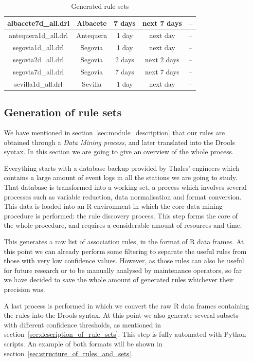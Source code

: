 \begin{table}
\begin{center}
\begin{tabular}{|c|c|c|c|c|}
\hline  
albacete7d\_all.drl & Albacete & 7 days & next 7 days & -- \\ 
\hline 
antequera1d\_all.drl & Antequera & 1 day & next day & -- \\ 
\hline 
segovia1d\_all.drl & Segovia & 1 day & next day & -- \\ 
\hline
segovia2d\_all.drl & Segovia & 2 days & next 2 days & -- \\  
\hline 
segovia7d\_all.drl & Segovia & 7 days & next 7 days & -- \\  
\hline 
sevilla1d\_all.drl & Sevilla & 1 day & next day & -- \\ 
\hline

\end{tabular} 
\caption{Generated rule sets} \label{tab:ruleset_list}
\end{center}
\end{table}

\subsection{Generation of rule sets}
\label{sec:generation_of_rule_sets}

We have mentioned in section~\ref{sec:module_description} that our rules are obtained through a \emph{Data Mining process}, and later translated into the Drools syntax. In this section we are going to give an overview of the whole process.

Everything starts with a database backup provided by Thales' engineers which contains a large amount of event logs in all the stations we are going to study. That database is transformed into a working set, a process which involves several processes such as variable reduction, data normalisation and format conversion. This data is loaded into an R\cite{ihaka1996r, torgo2003data} environment in which the core data mining procedure is performed: the rule discovery process. This step forms the core of the whole procedure, and requires a considerable amount of resources and time.

This generates a raw list of association rules, in the format of R data frames. At this point we can already perform some filtering to separate the useful rules from those with very low confidence values. However, as those rules can also be useful for future research or to be manually analysed by maintenance operators, so far we have decided to save the whole amount of generated rules whichever their precision was.

A last process is performed in which we convert the raw R data frames\cite{ihaka1996r} containing the rules into the Drools syntax. At this point we also generate several subsets with different confidence thresholds, as mentioned in section~\ref{sec:description_of_rule_sets}. This step is fully automated with Python\cite{sanner1999python} scripts. An example of both formats will be shown in section~\ref{sec:structure_of_rules_and_sets}.

